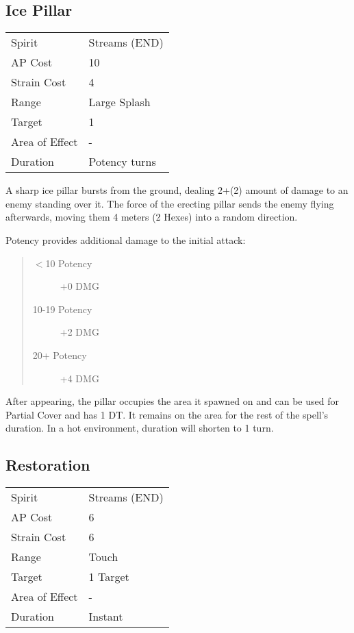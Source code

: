 \documentclass[11pt,a4paper,twocolumn]{book}
\begin{document}
\medskip

\subsection*{Ice Pillar}
{
	\begin{tabu} to 70mm{| X[l,4] | X[l,7] |}
		\hline
		Spirit         & Streams (END)       \\
		AP Cost        & 10                   \\
		Strain Cost    & 4                    \\
		Range          & Large Splash         \\
		Target         & 1                    \\
		Area of Effect & -                    \\
		Duration       & Potency turns \\ \hline
	\end{tabu}
	
}
\medskip

A sharp ice pillar bursts from the ground, dealing 2+(2) amount of damage to an enemy standing over it. The force of the erecting pillar sends the enemy flying afterwards, moving them 4 meters (2 Hexes) into a random direction.

Potency provides additional damage to the initial attack:
\begin{quote}
	\begin{description}
		\item[$<$10 Potency] 	+0 DMG
		\item[10-19 Potency] 	+2 DMG
		\item[20+ Potency]  	+4 DMG
	\end{description}	
\end{quote}

After appearing, the pillar occupies the area it spawned on and can be used for Partial Cover and has 1 DT. It remains on the area for the rest of the spell's duration. In a hot environment, duration will shorten to 1 turn.

\subsection*{Restoration}
{
	\begin{tabu} to 75mm{| X[l,4] | X[l,7] |}
		\hline
		Spirit 			& Streams (END) 		\\
		AP Cost	      	& 6 					\\
		Strain Cost     & 6 					\\
		Range     		& Touch					\\
		Target      	& 1 Target				\\
		Area of Effect  & -  	 				\\
		Duration     	& Instant				\\ \hline
	\end{tabu}
	
}
\end{document}

